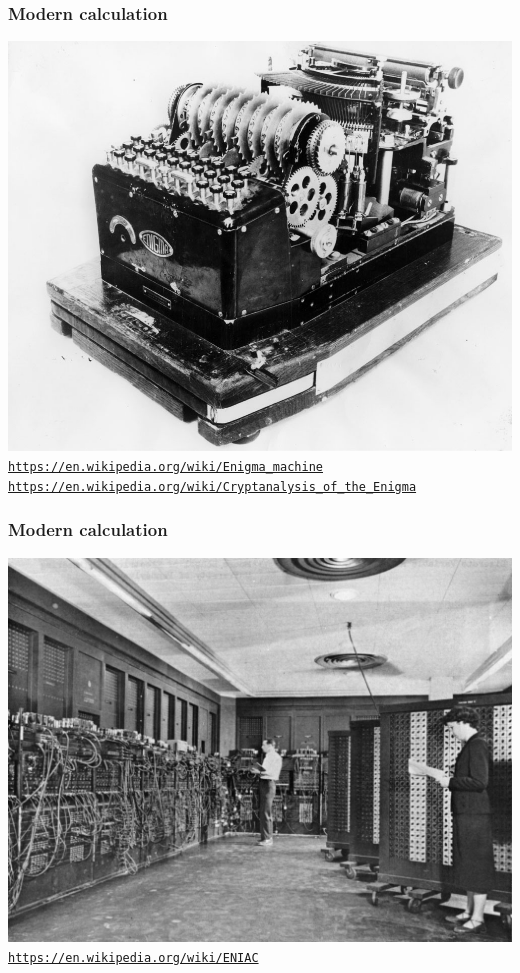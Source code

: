 \documentclass[11pt]{beamer}
\begin{document}
\begin{frame}[fragile]
  \frametitle{Modern calculation}

  \includegraphics[height=0.75\textheight]{./img/enigma.jpg}\\
     \textcolor{\CSBase}{\small \texttt{\url{https://en.wikipedia.org/wiki/Enigma\_machine}}}
     \textcolor{\CSBase}{\small \texttt{\url{https://en.wikipedia.org/wiki/Cryptanalysis\_of\_the\_Enigma}}}
     
\end{frame}

\begin{frame}[fragile]
  \frametitle{Modern calculation}

  \includegraphics[height=0.75\textheight]{./img/eniac.jpg}\\
   \textcolor{\CSBase}{\small \texttt{\url{https://en.wikipedia.org/wiki/ENIAC}}}
\end{frame}
\end{document}
